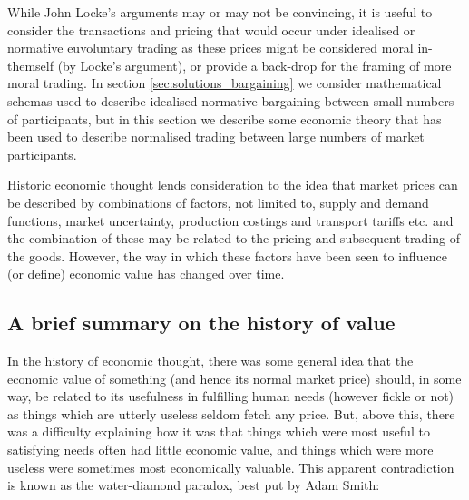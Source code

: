 While John Locke's arguments may or may not be convincing, it is useful to consider the transactions and pricing that would occur under idealised or normative euvoluntary trading as these prices might be considered moral in-themself (by Locke's argument), or provide a back-drop for the framing of more moral trading.
In section \ref{sec:solutions_bargaining} we consider mathematical schemas used to describe idealised normative bargaining between small numbers of participants, but in this section we describe some economic theory that has been used to describe normalised trading between large numbers of market participants.

Historic economic thought lends consideration to the idea that market prices can be described by combinations of factors, not limited to, supply and demand functions, market uncertainty, production costings and transport tariffs etc. and the combination of these may be related to the pricing and subsequent trading of the goods.
However, the way in which these factors have been seen to influence (or define) economic value has changed over time.

\subsection{A brief summary on the history of value}

In the history of economic thought, there was some general idea that the economic value of something (and hence its normal market price) should, in some way, be related to its usefulness in fulfilling human needs (however fickle or not) as things which are utterly useless seldom fetch any price.
But, above this, there was a difficulty explaining how it was that things which were most useful to satisfying needs often had little economic value, and things which were more useless were sometimes most economically valuable. This apparent contradiction is known as the water-diamond paradox, best put by Adam Smith:

